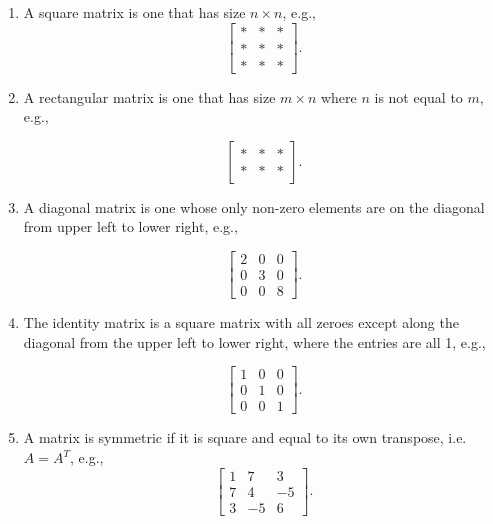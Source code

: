 \begin{sol}
\begin{enumerate}
    \item A square matrix is one that has size $n \times n$, e.g.,
\[ \left[ \begin{array}{rrr}
   * & * & * \\
   * & * & * \\
   * & * & *
 \end{array} \right].
\]

\item A rectangular matrix is one that has size $m \times n$ where $n$ is not equal to $m$, e.g.,

\[ \left[ \begin{array}{rrr}
   * & * & * \\
   * & * & * 
 \end{array} \right].
\]

\item A diagonal matrix is one whose only non-zero elements are on the diagonal from upper left to lower right, e.g.,

\[ \left[ \begin{array}{rrr}
   2 & 0 & 0 \\
   0 & 3 & 0 \\
   0 & 0 & 8
 \end{array} \right].
\]

\item The identity matrix is a square matrix with all zeroes except along the diagonal from the upper left to lower right, where the entries are all 1, e.g.,

\[ \left[ \begin{array}{rrr}
   1 & 0 & 0 \\
   0 & 1 & 0 \\
   0 & 0 & 1
 \end{array} \right].
\]



\item A matrix is symmetric if it is square and equal to its own transpose, i.e. $A=A^{T}$, e.g.,
\[ \left[ \begin{array}{rrr}
   1 & 7 & 3 \\
   7 & 4 & -5 \\
   3 & -5 & 6
 \end{array} \right].
\]


\end{enumerate}
\end{sol}
